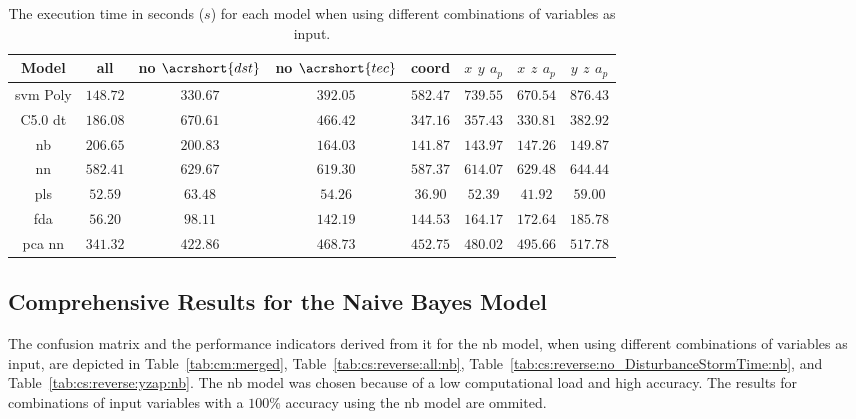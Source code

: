 \documentclass[sn-mathphys-num]{sn-jnl}%
\begin{document}
\begin{table}[!ht]
	\centering
    \caption{The execution time in seconds ($s$) for each model when using different combinations of variables as input.}
	\label{tab:time:total}
	\begin{tabular}{|c|c|c|c|c|c|c|c|}
		\hline
		Model & all & no $\acrshort{dst}$ & no $\acrshort{tec}$ & coord & $x$ $y$ $a_{p}$ & $x$ $z$ $a_{p}$ & $y$ $z$ $a_{p}$ \\ \hline
		\acrshort{svm} Poly & $148.72$ & $330.67$ & $392.05$ & $582.47$ & $739.55$ & $670.54$ & $876.43$ \\ \hline
		C5.0 \acrshort{dt} & $186.08$ & $670.61$ & $466.42$ & $347.16$ & $357.43$ & $330.81$ & $382.92$ \\ \hline
		\acrshort{nb} & $206.65$ & $200.83$ & $164.03$ & $141.87$ & $143.97$ & $147.26$ & $149.87$ \\ \hline
		\acrshort{nn} & $582.41$ & $629.67$ & $619.30$ & $587.37$ & $614.07$ & $629.48$ & $644.44$ \\ \hline
		\acrshort{pls} & $52.59$ & $63.48$ & $54.26$ & $36.90$ & $52.39$ & $41.92$ & $59.00$ \\ \hline
		\acrshort{fda} & $56.20$ & $98.11$ & $142.19$ & $144.53$ & $164.17$ & $172.64$ & $185.78$ \\ \hline
		\acrshort{pca} \acrshort{nn} & $341.32$ & $422.86$ & $468.73$ & $452.75$ & $480.02$ & $495.66$ & $517.78$ \\ \hline
	\end{tabular}
\end{table}

\subsection{Comprehensive Results for the Naive Bayes Model}

The confusion matrix and the performance indicators derived from it for the \acrfull{nb} model, when using different combinations of variables as input, are depicted in Table~\ref{tab:cm:merged}, Table~\ref{tab:cs:reverse:all:nb}, Table~\ref{tab:cs:reverse:no_DisturbanceStormTime:nb}, and Table~\ref{tab:cs:reverse:yzap:nb}. The \acrshort{nb} model was chosen because of a low computational load and high accuracy. The results for combinations of input variables with a $100\%$ accuracy using the \acrshort{nb} model are ommited.
\end{document}
